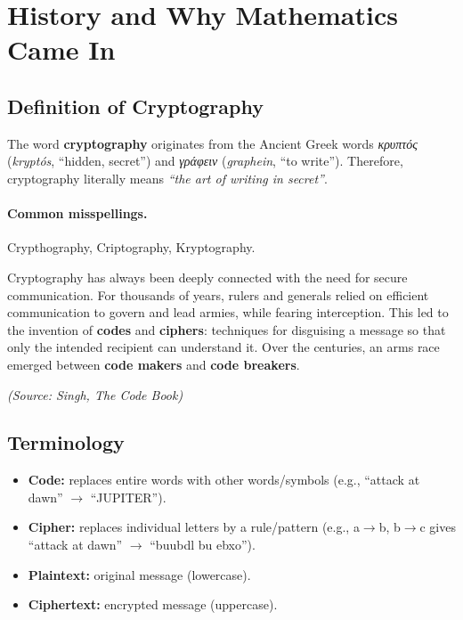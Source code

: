 
\newtheorem{theorem}{Theorem}[section]
\newtheorem{proposition}{Proposition}[section]
\newtheorem{corollary}{Corollary}[section]
\newtheorem*{remark}{Remark}

\section{History and Why Mathematics Came In}

\subsection{Definition of Cryptography}

The word \textbf{cryptography} originates from the Ancient Greek words \textit{κρυπτός} (\textit{kryptós}, “hidden, secret”) and \textit{γράφειν} (\textit{graphein}, “to write”). Therefore, cryptography literally means \textit{“the art of writing in secret”}.

\paragraph{Common misspellings.}
Crypthography, Criptography, Kryptography.

Cryptography has always been deeply connected with the need for secure communication. For thousands of years, rulers and generals relied on efficient communication to govern and lead armies, while fearing interception. This led to the invention of \textbf{codes} and \textbf{ciphers}: techniques for disguising a message so that only the intended recipient can understand it. Over the centuries, an arms race emerged between \textbf{code makers} and \textbf{code breakers}.

\begin{flushright}
\textit{(Source: Singh, \emph{The Code Book})}
\end{flushright}

\subsection{Terminology}

\begin{itemize}
  \item \textbf{Code:} replaces entire words with other words/symbols (e.g., “attack at dawn” $\rightarrow$ “JUPITER”).
  \item \textbf{Cipher:} replaces individual letters by a rule/pattern (e.g., a$\rightarrow$b, b$\rightarrow$c gives “attack at dawn” $\rightarrow$ “buubdl bu ebxo”).
  \item \textbf{Plaintext:} original message (lowercase).
  \item \textbf{Ciphertext:} encrypted message (uppercase).
\end{itemize}

